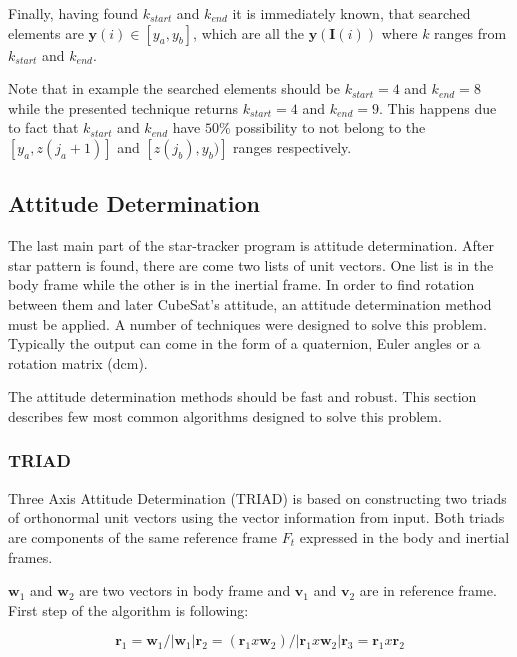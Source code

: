 \documentclass[12pt,a4paper,twoside]{article}
\begin{document}
Finally, having found $k_{start}$ and $k_{end}$ it is immediately known, that searched elements are $\bm{y}(i) \in [y_a, y_b]$, which are all the $\bm{y}(\bm{I}(i))$ where $k$ ranges from $k_{start}$ and $k_{end}$.

Note that in example the searched elements should be $k_{start} = 4$ and $k_{end} = 8$ while the presented technique returns $k_{start} = 4$ and $k_{end} = 9$. This happens due to fact that $k_{start}$ and $k_{end}$ have $50\%$ possibility to not belong to the $[y_a, z(j_a +1)]$ and $[z(j_b), y_b)]$ ranges respectively.

\subsection{Attitude Determination}

The last main part of the star-tracker program is attitude determination. After star pattern is found, there are come two lists of unit vectors. One list is in the body frame while the other is in the inertial frame. In order to find rotation between them and later CubeSat's attitude, an attitude determination method must be applied. A number of techniques were designed to solve this problem. Typically the output can come in the form of a quaternion, Euler angles or a rotation matrix (\gls{dcm}).

The attitude determination methods should be fast and robust. This section describes few most common algorithms designed to solve this problem.


\subsubsection{TRIAD}

Three Axis Attitude Determination (TRIAD) is based on constructing two triads of orthonormal unit vectors using the vector information from input. Both triads are components of the same reference frame $F_t$ expressed in the body and inertial frames\cite{hall2003spacecraft}.

$\bm{w}_1$ and $\bm{w}_2$ are two vectors in body frame and $\bm{v}_1$ and $\bm{v}_2$ are in reference frame. First step of the algorithm is following:

\begin{subequations}
\begin{equation}
\bm{r}_1 = \bm{w}_1/|\bm{w}_1|
\end{equation}
\begin{equation}
\bm{r}_2 = (\bm{r}_1 x \bm{w}_2) /|\bm{r}_1 x \bm{w}_2|
\end{equation}
\begin{equation}
\bm{r}_3 = \bm{r}_1 x \bm{r}_2
\end{equation}
\end{subequations}
\end{document}
